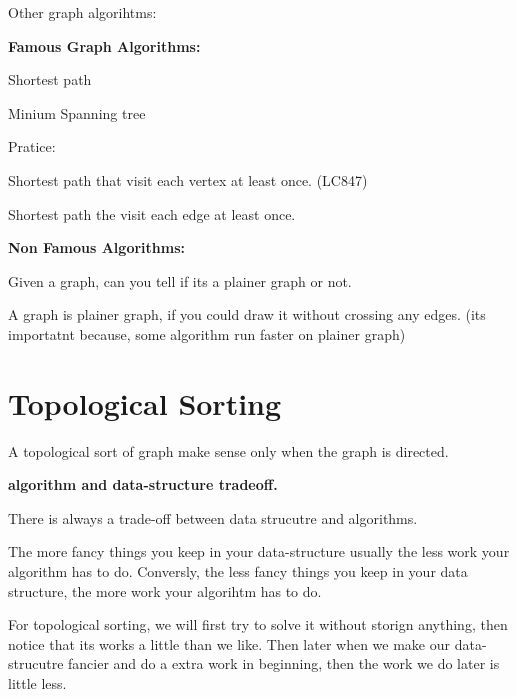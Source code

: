 Other graph algorihtms:
\begin{exercise}
    \textbf{Famous Graph Algorithms:}
    \begin{compactenum}
        \item  Shortest path
        \item Minium Spanning tree
    \end{compactenum}

    Pratice:
    \begin{compactenum}
        \item Shortest path that visit each vertex at least once. (LC847)
        \item Shortest path the visit each edge at least once.
    \end{compactenum}

    \textbf{Non Famous Algorithms:}
    \begin{compactenum}
        \item Given a graph, can you tell if its a plainer graph or not.
        
        A graph is plainer graph, if you could draw it without crossing any edges. (its importatnt because, some algorithm run faster on plainer graph)
    \end{compactenum}
\end{exercise}

\newpage
\section*{Topological Sorting}
A topological sort of graph make sense only when the graph is directed.

\begin{marginfigure}
    \raggedright
\textbf{algorithm and data-structure tradeoff.}

There is always a trade-off between data strucutre and algorithms.
\vspace*{2mm}

The more fancy things you keep in your data-structure usually the less work your algorithm has to do. Conversly, the less fancy things you keep in your data structure, the more work your algorihtm has to do.
\end{marginfigure}

 For topological sorting, we will first try to solve it without storign anything, then notice that its works a little than we like. Then later when we make our data-strucutre fancier and do a extra work in beginning, then the work we do later is little less.

